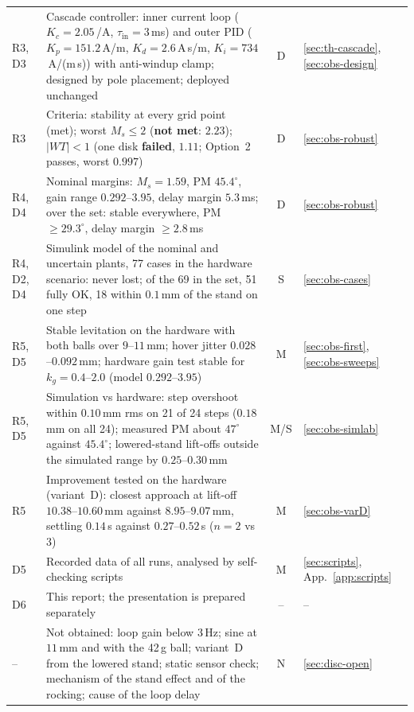 \documentclass[11pt,a4paper]{article}
\begin{document}
{\begin{longtable}{@{}>{\raggedright\arraybackslash}p{1.6cm}>{\raggedright\arraybackslash}p{10.2cm}c>{\raggedright\arraybackslash}p{1.5cm}@{}}
R3, D3 & Cascade controller: inner current loop ($K_c = 2.05$\,/A, $\tau_{\mathrm{in}} = 3$\,ms) and outer PID
($K_p = 151.2$\,A/m, $K_d = 2.6$\,A\,s/m, $K_i = 734$\,A/(m\,s)) with anti-windup clamp; designed by pole placement; deployed
unchanged & D & \ref{sec:th-cascade}, \ref{sec:obs-design} \\
R3 & Criteria: stability at every grid point (met); worst $M_s \le 2$ (\textbf{not met}: $2.23$); $|WT| < 1$ (one disk
\textbf{failed}, $1.11$; Option~2 passes, worst $0.997$) & D & \ref{sec:obs-robust} \\
R4, D4 & Nominal margins: $M_s = 1.59$, PM $45.4^\circ$, gain range $0.292$--$3.95$, delay margin $5.3$\,ms; over the set:
stable everywhere, PM $\ge 29.3^\circ$, delay margin $\ge 2.8$\,ms & D & \ref{sec:obs-robust} \\
R4, D2, D4 & Simulink model of the nominal and uncertain plants, 77 cases in the hardware scenario: never lost; of the 69 in the
set, 51 fully OK, 18 within $0.1$\,mm of the stand on one step & S & \ref{sec:obs-cases} \\
R5, D5 & Stable levitation on the hardware with both balls over $9$--$11$\,mm; hover jitter $0.028$--$0.092$\,mm; hardware gain
test stable for $k_g = 0.4$--$2.0$ (model $0.292$--$3.95$) & M & \ref{sec:obs-first}, \ref{sec:obs-sweeps} \\
R5, D5 & Simulation vs hardware: step overshoot within $0.10$\,mm rms on 21 of 24 steps ($0.18$\,mm on all 24); measured PM
about $47^\circ$ against $45.4^\circ$; lowered-stand lift-offs outside the simulated range by $0.25$--$0.30$\,mm & M/S &
\ref{sec:obs-simlab} \\
R5 & Improvement tested on the hardware (variant~D): closest approach at lift-off $10.38$--$10.60$\,mm against
$8.95$--$9.07$\,mm, settling $0.14$\,s against $0.27$--$0.52$\,s ($n = 2$ vs $3$) & M & \ref{sec:obs-varD} \\
D5 & Recorded data of all runs, analysed by self-checking scripts & M & \ref{sec:scripts}, App.~\ref{app:scripts} \\
D6 & This report; the presentation is prepared separately & -- & -- \\
-- & Not obtained: loop gain below $3$\,Hz; sine at $11$\,mm and with the 42\,g ball; variant~D from the lowered stand; static
sensor check; mechanism of the stand effect and of the rocking; cause of the loop delay & N & \ref{sec:disc-open} \\
\bottomrule
\end{longtable}}
\end{document}
